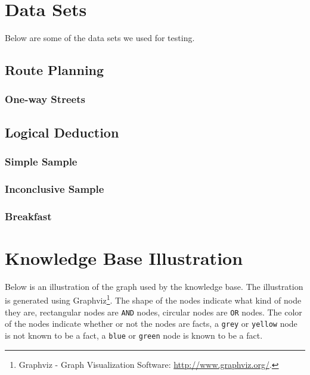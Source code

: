 \documentclass[11pt]{article}
\begin{document}
\clearpage
{}
\begin{appendices}

\section{Data Sets}
Below are some of the data sets we used for testing.

\subsection{Route Planning}
\subsubsection{One-way Streets}
\label{subsec:oneway}


\subsection{Logical Deduction}
\subsubsection{Simple Sample}
\label{subsec:simplesamp}


\subsubsection{Inconclusive Sample}
\label{subsec:inconsamp}


\subsubsection{Breakfast}
\label{subsec:breakfastsamp}


\clearpage
 
\section{Knowledge Base Illustration}
\label{sec:illustration}
Below is an illustration of the graph used by the knowledge base. The illustration is generated using Graphviz\footnote{Graphviz - Graph Visualization Software:  \url{http://www.graphviz.org/}.}. The shape of the nodes indicate what kind of node they are, rectangular nodes are {\tt AND} nodes, circular nodes are {\tt OR} nodes. The color of the nodes indicate whether or not the nodes are facts, a {\tt grey} or {\tt yellow} node is not known to be a fact, a {\tt blue} or {\tt green} node is known to be a fact.


\end{appendices}
\end{document}
